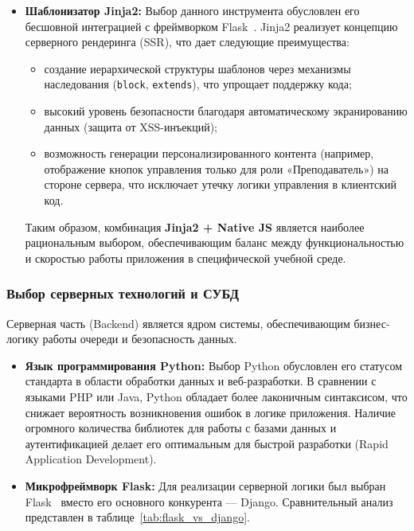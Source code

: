 \begin{itemize}
\item \textbf{Шаблонизатор Jinja2:} Выбор данного инструмента обусловлен его бесшовной интеграцией с фреймворком
Flask~\cite{jinja2_docs}. Jinja2 реализует концепцию серверного рендеринга (SSR), что дает следующие преимущества:
\begin{itemize}
    \item создание иерархической структуры шаблонов через механизмы наследования (\texttt{block}, \texttt{extends}), 
	что упрощает поддержку кода;
    \item высокий уровень безопасности благодаря автоматическому экранированию данных (защита от XSS-инъекций);
    \item возможность генерации персонализированного контента (например, отображение кнопок управления только 
	для роли «Преподаватель») на стороне сервера, что исключает утечку логики управления в клиентский код.
\end{itemize}

Таким образом, комбинация \textbf{Jinja2 + Native JS} является наиболее рациональным выбором, обеспечивающим 
баланс между функциональностью и скоростью работы приложения в специфической учебной среде.
\end{itemize}

\subsubsection{Выбор серверных технологий и СУБД}

Серверная часть (Backend) является ядром системы, обеспечивающим бизнес-логику работы очереди и безопасность данных.

\begin{itemize}
 \item \textbf{Язык программирования Python:} Выбор Python обусловлен его статусом стандарта в области обработки 
 данных и веб-разработки. В сравнении с языками PHP или Java, Python обладает более лаконичным синтаксисом, что снижает 
 вероятность возникновения ошибок в логике приложения. Наличие огромного количества библиотек для работы с базами данных
  и аутентификацией делает его оптимальным для быстрой разработки (Rapid Application Development).
 
 \item \textbf{Микрофреймворк Flask:} Для реализации серверной логики был выбран Flask~\cite{flask_docs, grinberg_flask} вместо его
 основного конкурента — Django. Сравнительный анализ представлен в таблице~\ref{tab:flask_vs_django}.
\end{itemize}


